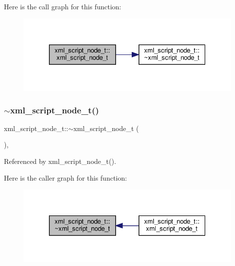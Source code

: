 Here is the call graph for this function\+:
\nopagebreak
\begin{figure}[H]
\begin{center}
\leavevmode
\includegraphics[width=320pt]{d6/de5/classxml__script__node__t_aace8091f12771c1bb40433e1222a9305_cgraph}
\end{center}
\end{figure}
\mbox{\label{classxml__script__node__t_ad820fc2326bb87dbfb3cb799cc5a61d1}} 
\subsubsection{\texorpdfstring{$\sim$xml\+\_\+script\+\_\+node\+\_\+t()}{~xml\_script\_node\_t()}}
{\footnotesize\ttfamily xml\+\_\+script\+\_\+node\+\_\+t\+::$\sim$xml\+\_\+script\+\_\+node\+\_\+t (\begin{DoxyParamCaption}{ }\end{DoxyParamCaption})\hspace{0.3cm}{\ttfamily [virtual]}, {\ttfamily [default]}}



Referenced by xml\+\_\+script\+\_\+node\+\_\+t().

Here is the caller graph for this function\+:
\nopagebreak
\begin{figure}[H]
\begin{center}
\leavevmode
\includegraphics[width=320pt]{d6/de5/classxml__script__node__t_ad820fc2326bb87dbfb3cb799cc5a61d1_icgraph}
\end{center}
\end{figure}


